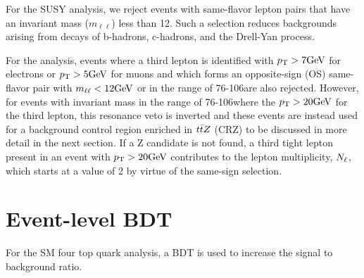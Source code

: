 For the SUSY analysis, we reject events with same-flavor lepton pairs
that have an invariant mass ($m_{\ell\ell}$) less than 12\GeV. Such a selection
reduces backgrounds arising from decays of b-hadrons, c-hadrons, and the Drell-Yan
process.

For the \smft analysis, events where a third lepton is identified with $p_{\mathrm{T}}>7\text{GeV}$ for electrons
or $p_{\mathrm{T}}>5\text{GeV}$ for muons and which forms an opposite-sign (OS) same-flavor pair
with $m_{\ell\ell}<12\text{GeV}$ or in the range of 76-106\GeV are also rejected.
However, for events with invariant mass in the range of 76-106\GeV where
the $p_{\mathrm{T}}>20\text{GeV}$ for the third lepton, 
this resonance veto is inverted
and these events are instead used for a background control region 
enriched in $t\bar{t} Z$ (CRZ) to be discussed in more detail in the next
section. If a Z candidate is not found, a third tight lepton present in an event
with $p_{\mathrm{T}}>20\text{GeV}$ contributes to the lepton multiplicity, $N_\ell$, which 
starts at a value of 2 by virtue of the same-sign selection.

\section{Event-level BDT}

For the SM four top quark analysis, a BDT is used to increase the signal to
background ratio.


